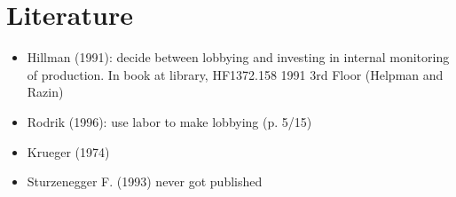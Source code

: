 \documentclass[12pt]{article}
\begin{document}
\section{Literature}
\begin{itemize}
	\item Hillman (1991): decide between lobbying and investing in internal monitoring of production. In book at library, HF1372.158 1991 3rd Floor (Helpman and Razin)
	\item Rodrik (1996): use labor to make lobbying (p. 5/15)
	\item Krueger (1974)
	\item Sturzenegger F. (1993) never got published
\end{itemize}
\end{document}
